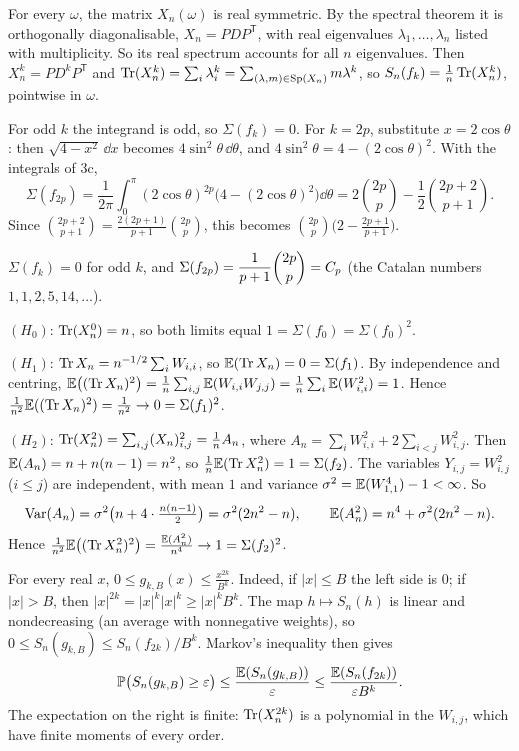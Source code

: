 \documentclass[11pt,a4paper]{article}
\begin{document}

For every $\omega$, the matrix $X_n(\omega)$ is real symmetric. By the spectral theorem it
is orthogonally diagonalisable, $X_n = PDP^{\mathsf T}$, with real eigenvalues
$\lambda_1,\dots,\lambda_n$ listed with multiplicity. So its real spectrum accounts for all
$n$ eigenvalues. Then $X_n^k = PD^kP^{\mathsf T}$ and
$\operatorname{Tr}(X_n^k) = \sum_i\lambda_i^k = \sum_{(\lambda,m)\in\operatorname{Sp}(X_n)} m\lambda^k$, so
$S_n(f_k) = \frac1n\operatorname{Tr}(X_n^k)$, pointwise in $\omega$.

For odd $k$ the integrand is odd, so $\Sigma(f_k) = 0$. For $k = 2p$, substitute
$x = 2\cos\theta$: then $\sqrt{4-x^2}\,\dd x$ becomes $4\sin^2\theta\,\dd\theta$, and
$4\sin^2\theta = 4 - (2\cos\theta)^2$. With the integrals of 3c,
\[
  \Sigma(f_{2p}) = \frac1{2\pi}\int_0^\pi(2\cos\theta)^{2p}\bigl(4-(2\cos\theta)^2\bigr)\dd\theta
  = 2\binom{2p}{p} - \frac12\binom{2p+2}{p+1}.
\]
Since $\binom{2p+2}{p+1} = \frac{2(2p+1)}{p+1}\binom{2p}{p}$, this becomes
$\binom{2p}p\bigl(2 - \frac{2p+1}{p+1}\bigr)$.
\begin{result}
$\Sigma(f_k) = 0$ for odd $k$, and
$\Sigma(f_{2p}) = \dfrac{1}{p+1}\dbinom{2p}{p} = C_p$ (the Catalan numbers
$1, 1, 2, 5, 14,\dots$).
\end{result}

$(H_0)$: $\operatorname{Tr}(X_n^0) = n$, so both limits equal $1 = \Sigma(f_0) = \Sigma(f_0)^2$.

$(H_1)$: $\operatorname{Tr} X_n = n^{-1/2}\sum_iW_{i,i}$, so $\mathbb{E}(\operatorname{Tr} X_n) = 0 = \Sigma(f_1)$. By independence
and centring, $\mathbb{E}\bigl((\operatorname{Tr} X_n)^2\bigr) = \frac1n\sum_{i,j}\mathbb{E}(W_{i,i}W_{j,j})
= \frac1n\sum_i\mathbb{E}(W_{i,i}^2) = 1$. Hence $\frac1{n^2}\mathbb{E}((\operatorname{Tr} X_n)^2) = \frac1{n^2}\to0 = \Sigma(f_1)^2$.

$(H_2)$: $\operatorname{Tr}(X_n^2) = \sum_{i,j}(X_n)_{i,j}^2 = \frac1n A_n$, where
$A_n = \sum_iW_{i,i}^2 + 2\sum_{i<j}W_{i,j}^2$. Then $\mathbb{E}(A_n) = n + n(n-1) = n^2$, so
$\frac1n\mathbb{E}(\operatorname{Tr} X_n^2) = 1 = \Sigma(f_2)$. The variables $Y_{i,j} = W_{i,j}^2$ ($i\le j$) are
independent, with mean $1$ and variance $\sigma^2 = \mathbb{E}(W_{1,1}^4)-1 < \infty$. So
\[
  \mathrm{Var}(A_n) = \sigma^2\bigl(n + 4\cdot\tfrac{n(n-1)}2\bigr) = \sigma^2(2n^2-n),
  \qquad \mathbb{E}(A_n^2) = n^4 + \sigma^2(2n^2-n).
\]
Hence $\frac1{n^2}\mathbb{E}\bigl((\operatorname{Tr} X_n^2)^2\bigr) = \frac{\mathbb{E}(A_n^2)}{n^4}\to1 = \Sigma(f_2)^2$.

For every real $x$, $0\le g_{k,B}(x)\le\frac{x^{2k}}{B^k}$. Indeed, if $|x|\le B$ the left
side is $0$; if $|x|>B$, then $|x|^{2k} = |x|^k|x|^k\ge|x|^kB^k$. The map $h\mapsto S_n(h)$ is
linear and nondecreasing (an average with nonnegative weights), so
$0\le S_n(g_{k,B})\le S_n(f_{2k})/B^k$. Markov's inequality then gives
\[
  \mathbb{P}\bigl(S_n(g_{k,B})\ge\varepsilon\bigr)\le\frac{\mathbb{E}(S_n(g_{k,B}))}{\varepsilon}
  \le\frac{\mathbb{E}(S_n(f_{2k}))}{\varepsilon B^k}.
\]
The expectation on the right is finite: $\operatorname{Tr}(X_n^{2k})$ is a polynomial in the $W_{i,j}$,
which have finite moments of every order.
\end{document}
